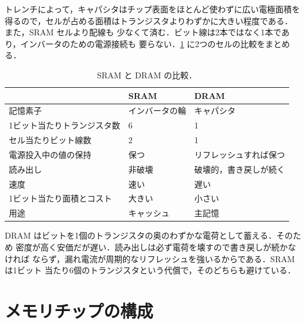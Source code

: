 \documentclass[../main.tex]{subfiles}
\begin{document}
トレンチによって，キャパシタはチップ表面をほとんど使わずに広い電極面積を
得るので，セルが占める面積はトランジスタよりわずかに大きい程度である．%
また，SRAM セルより配線も
少なくて済む．ビット線は2本ではなく1本であり，インバータのための電源接続も
要らない．\cref{tab:l15-sram-dram} に2つのセルの比較をまとめる．

\begin{table}[htbp]
  \centering\small
  \caption{SRAM と DRAM の比較．}
  \label{tab:l15-sram-dram}
  \begin{tabular}{@{}lll@{}}
    \toprule
                            & SRAM             & DRAM \\
    \midrule
    記憶素子                & インバータの輪   & キャパシタ \\
    1ビット当たりトランジスタ数 & 6            & 1 \\
    セル当たりビット線数    & 2                & 1 \\
    電源投入中の値の保持    & 保つ             & リフレッシュすれば保つ \\
    読み出し                & 非破壊           & 破壊的，書き戻しが続く \\
    速度                    & 速い             & 遅い \\
    1ビット当たり面積とコスト & 大きい          & 小さい \\
    用途                    & キャッシュ       & 主記憶 \\
    \bottomrule
  \end{tabular}
\end{table}

\begin{keypoint}
  DRAM はビットを1個のトランジスタの奥のわずかな電荷として蓄える．そのため
  密度が高く安価だが遅い．読み出しは必ず電荷を壊すので書き戻しが続かなければ
  ならず，漏れ電流が周期的なリフレッシュを強いるからである．SRAM は1ビット
  当たり6個のトランジスタという代償で，そのどちらも避けている．
\end{keypoint}

\section{メモリチップの構成}
\label{sec:l15-chip}
\end{document}

